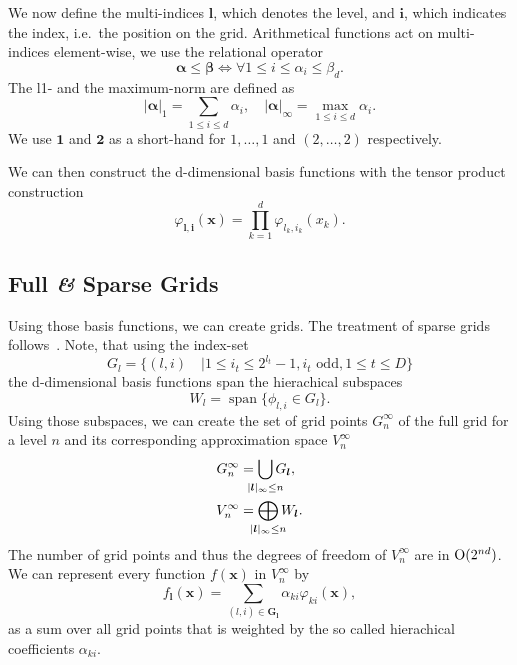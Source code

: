 We now define the multi-indices \(\bm{l}\), which denotes the level, and \(\bm{i}\), which indicates the index, i.e.~the position on the grid.
Arithmetical functions act on multi-indices element-wise, we use the relational operator
\begin{equation*}
  \bm{\alpha} \leq \bm{\beta} \iff \forall 1 \leq i \leq \alpha_i \leq \beta_d.
\end{equation*}
The l1- and the maximum-norm are defined as
\begin{equation*}
  \vert \bm{\alpha} \vert_1 = \sum_{1 \leq i \leq d} \alpha_i, \quad \vert \bm{\alpha} \vert_\infty = \max_{1 \leq i \leq d} \alpha_i .
\end{equation*}
We use \(\bm{1}\) and \(\bm{2}\) as a short-hand for \(1, \ldots, 1\) and
\((2, \ldots, 2)\) respectively.

We can then construct the d-dimensional basis functions with the tensor product construction
\begin{equation*}
\varphi_{\bm{l}, \bm{i}} (\bm{x}) = \prod_{k=1}^d \varphi_{l_k, i_k} (x_k).
\end{equation*}

\subsection{Full \textit{\&} Sparse Grids}
Using those basis functions, we can create grids.
The treatment of sparse grids follows~\cite{bungartzSparse}.
Note, that using the index-set
\begin{equation*}
 G_l = \{(l,i) \quad | 1 \leq i_t \leq 2^{l_t} -1, i_t \text{ odd}, 1 \leq t \leq D\}
\end{equation*}
the d-dimensional basis functions span the hierachical subspaces
\begin{equation*}
  W_l = \operatorname{span}\{\phi_{l,i} \in G_l\}.
\end{equation*}
Using those subspaces, we can create the set of grid points \(G_n^\infty\) of the full grid for a level \(n\) and its corresponding approximation space \(V_n^\infty\)
\begin{align}
  G_n^\infty &= \bigcup_{\mathclap{\vert {\bm{l}} \vert_\infty \leq n}} G_{\bm{l}}, \\
  V_n^\infty &= \bigoplus_{\mathclap{\vert {\bm{l}} \vert_\infty \leq n}} W_{\bm{l}}.
\end{align}
The number of grid points and thus the degrees of freedom of \(V_n^\infty\) are in \( \operatorname{O} (2^{nd})\).
We can represent every function \(f(\bm{x})\) in \(V_n^\infty\) by
\begin{equation}\label{eq:coefficients-h2mix}
  f_{\bm{l}}(\bm{x}) = \sum_{(l,i) \in \bm{G_l}} \alpha_{ki} \varphi_{ki}(\bm{x}),
\end{equation}
as a sum over all grid points that is weighted by the so called hierachical coefficients \(\alpha_{ki}\).


